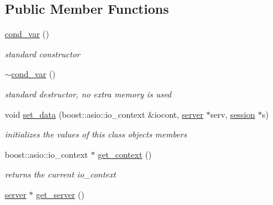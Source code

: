 \subsection*{Public Member Functions}
\begin{DoxyCompactItemize}
\item 
\mbox{\label{classcond__var_a93dbd1d43db5b2c64fd740c240e2418c}} 
\hyperlink{classcond__var_a93dbd1d43db5b2c64fd740c240e2418c}{cond\+\_\+var} ()
\begin{DoxyCompactList}\small\item\em standard constructor \end{DoxyCompactList}\item 
\mbox{\label{classcond__var_aeee90ce194ac52729ec961359d489bfb}} 
\hyperlink{classcond__var_aeee90ce194ac52729ec961359d489bfb}{$\sim$cond\+\_\+var} ()
\begin{DoxyCompactList}\small\item\em standard destructor, no extra memory is used \end{DoxyCompactList}\item 
\mbox{\label{classcond__var_a41eff0f79f6695bbaca67153559c4885}} 
void \hyperlink{classcond__var_a41eff0f79f6695bbaca67153559c4885}{set\+\_\+data} (boost\+::asio\+::io\+\_\+context \&iocont, \hyperlink{classserver}{server} $\ast$serv, \hyperlink{classsession}{session} $\ast$s)
\begin{DoxyCompactList}\small\item\em initializes the values of this class\textquotesingle{} object\textquotesingle{}s members \end{DoxyCompactList}\item 
\mbox{\label{classcond__var_aa517d0951844aaa609600903635b887d}} 
boost\+::asio\+::io\+\_\+context $\ast$ \hyperlink{classcond__var_aa517d0951844aaa609600903635b887d}{get\+\_\+context} ()
\begin{DoxyCompactList}\small\item\em returns the current io\+\_\+context \end{DoxyCompactList}\item 
\mbox{\label{classcond__var_ae55f3716e292cca887be939fe8f10c26}} 
\hyperlink{classserver}{server} $\ast$ \hyperlink{classcond__var_ae55f3716e292cca887be939fe8f10c26}{get\+\_\+server} ()

\end{DoxyCompactItemize}
